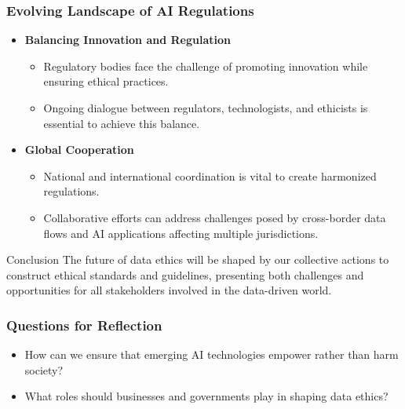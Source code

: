 \documentclass[aspectratio=169]{beamer}
\begin{document}
\begin{frame}[fragile]
    \frametitle{Evolving Landscape of AI Regulations}
    \begin{itemize}
        \item \textbf{Balancing Innovation and Regulation}
            \begin{itemize}
                \item Regulatory bodies face the challenge of promoting innovation while ensuring ethical practices.
                \item Ongoing dialogue between regulators, technologists, and ethicists is essential to achieve this balance.
            \end{itemize}
            
        \item \textbf{Global Cooperation}
            \begin{itemize}
                \item National and international coordination is vital to create harmonized regulations.
                \item Collaborative efforts can address challenges posed by cross-border data flows and AI applications affecting multiple jurisdictions.
            \end{itemize}
    \end{itemize}

    \begin{block}{Conclusion}
        The future of data ethics will be shaped by our collective actions to construct ethical standards and guidelines, presenting both challenges and opportunities for all stakeholders involved in the data-driven world.
    \end{block}
\end{frame}

\begin{frame}[fragile]
    \frametitle{Questions for Reflection}
    \begin{itemize}
        \item How can we ensure that emerging AI technologies empower rather than harm society?
        \item What roles should businesses and governments play in shaping data ethics?
    \end{itemize}
\end{frame}
\end{document}

